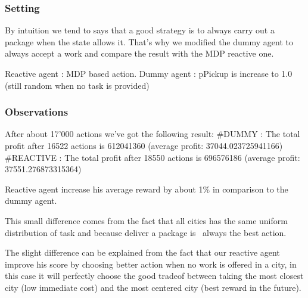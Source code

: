 \documentclass[11pt]{article}
\begin{document}
\subsubsection{Setting}

By intuition we tend to says that a good strategy is to always carry out a package when the state
allows it. That's why we modified the dummy agent to always accept a work and compare the result
with the MDP reactive one.

Reactive agent : MDP based action.
Dummy agent : pPickup is increase to 1.0 (still random when no task is provided)

\subsubsection{Observations}
After about 17'000 actions we've got the following result:
#DUMMY : The total profit after 16522 actions is 612041360 (average profit: 37044.023725941166)
#REACTIVE : The total profit after 18550 actions is 696576186 (average profit: 37551.276873315364)

Reactive agent increase his average reward by about 1\% in comparison to the dummy agent.

This small difference comes from the fact that all cities has the same uniform distribution of task
and because deliver a package is ~always the best action.

The slight difference can be explained from the fact that our reactive agent improve his score
by choosing better action when no work is offered in a city, in this case it will
perfectly choose the good tradeof between taking the most closest city (low immediate cost)
and the most centered city (best reward in the future).
\end{document}
